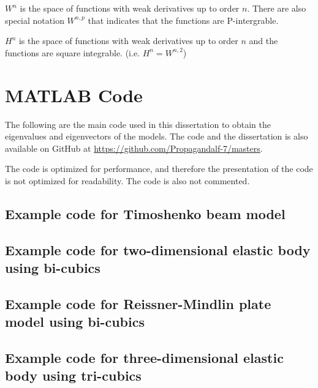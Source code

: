 \documentclass[main.tex]{subfiles}
\begin{document}
$W^n$ is the space of functions with weak derivatives up to order $n$. There are also special notation $W^{n,p}$ that indicates that the functions are P-intergrable. 

$H^n$ is the space of functions with weak derivatives up to order $n$ and the functions are square integrable. (i.e. $H^n = W^{n,2}$)

\chapter*{MATLAB Code}
The following are the main code used in this dissertation to obtain the eigenvalues and eigenvectors of the models. The code and the dissertation is also available on GitHub at \url{https://github.com/Propagandalf-7/masters}. 

The code is optimized for performance, and therefore the presentation of the code is not optimized for readability. The code is also not commented.


\section*{Example code for Timoshenko beam model}


\section*{Example code for two-dimensional elastic body using bi-cubics}


\section*{Example code for Reissner-Mindlin plate model using bi-cubics}


\section*{Example code for three-dimensional elastic body using tri-cubics}

\end{document}
